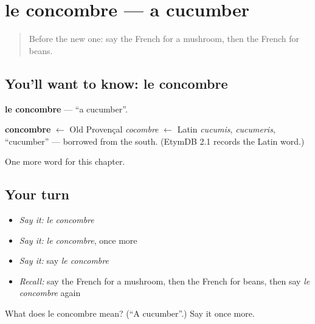 \section[le concombre]{le concombre — a cucumber}

\label{lesson:FR-C119-concombre}



\begin{quote}
Before the new one: say the French for a mushroom, then the French for beans.
\end{quote}

\subsection*{You'll want to know: le concombre}
\textbf{le concombre} — \textquotedblleft{}a cucumber\textquotedblright{}.

\begin{cousinweb}
\textbf{concombre} $\leftarrow$ Old Provençal \emph{cocombre} $\leftarrow$ Latin \emph{cucumis}, \emph{cucumeris}, \textquotedblleft{}cucumber\textquotedblright{} — borrowed from the south. (EtymDB 2.1 records the Latin word.)
\end{cousinweb}

\begin{grammarlens}[title={What you've built}]
One more word for this chapter.
\end{grammarlens}

\subsection*{Your turn}
\begin{itemize}
\raggedright
  \item \emph{Say it:} \emph{le concombre}
  \item \emph{Say it:} \emph{le concombre}, once more
  \item \emph{Say it:} say \emph{le concombre}
  \item \emph{Recall:} say the French for a mushroom, then the French for beans, then say \emph{le concombre} again
\end{itemize}

\begin{tcolorbox}[breakable,colback=teal!4,colframe=teal!35!black,title={Before you move on}]
What does le concombre mean? (\textquotedblleft{}A cucumber\textquotedblright{}.) Say it once more.
\end{tcolorbox}
